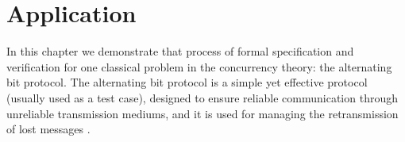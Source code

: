 \section{Application}
\label{sec:application}
In this chapter we demonstrate that process of formal specification and verification for 
one classical problem in the concurrency theory: the alternating bit protocol. The alternating bit protocol is a simple yet effective protocol (usually used as a test case), designed to ensure reliable communication through unreliable transmission mediums, and it is used for managing the retransmission of lost messages \cite{ReactiveSystems}\cite{Kulick}.


%